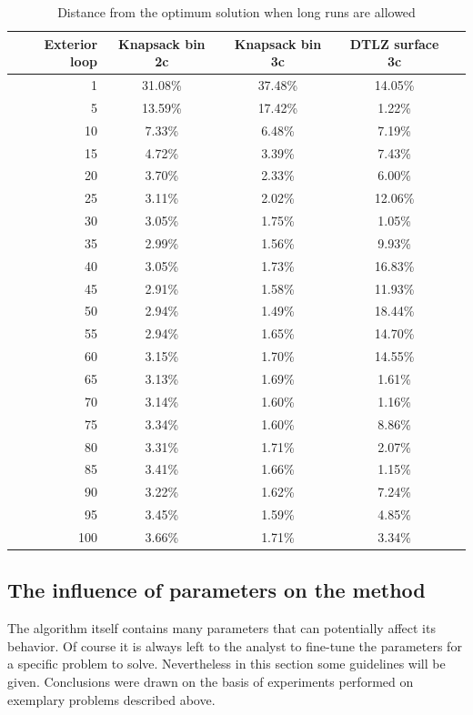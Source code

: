 \begin{table}
  \centering
  \begin{tabular}{r c c c c}
    \hline
    Exterior loop & Knapsack bin 2c & Knapsack bin 3c &
    DTLZ surface 3c \\
    \hline
    \hline
    1 & 31.08\% & 37.48\% & 14.05\% \\
    5 & 13.59\% & 17.42\% & 1.22\% \\
    10 & 7.33\% & 6.48\% & 7.19\% \\
    15 & 4.72\% & 3.39\% & 7.43\% \\
    20 & 3.70\% & 2.33\% & 6.00\% \\
    25 & 3.11\% & 2.02\% & 12.06\% \\
    30 & 3.05\% & 1.75\% & 1.05\% \\
    35 & 2.99\% & 1.56\% & 9.93\% \\
    40 & 3.05\% & 1.73\% & 16.83\% \\
    45 & 2.91\% & 1.58\% & 11.93\% \\
    50 & 2.94\% & 1.49\% & 18.44\% \\
    55 & 2.94\% & 1.65\% & 14.70\% \\
    60 & 3.15\% & 1.70\% & 14.55\% \\
    65 & 3.13\% & 1.69\% & 1.61\% \\
    70 & 3.14\% & 1.60\% & 1.16\% \\
    75 & 3.34\% & 1.60\% & 8.86\% \\
    80 & 3.31\% & 1.71\% & 2.07\% \\
    85 & 3.41\% & 1.66\% & 1.15\% \\
    90 & 3.22\% & 1.62\% & 7.24\% \\
    95 & 3.45\% & 1.59\% & 4.85\% \\
    100 & 3.66\% & 1.71\% & 3.34\% \\
    \hline
  \end{tabular}
  \caption{Distance from the optimum solution when long runs are allowed}
  \label{t:opt_dist_long}
\end{table}

\clearpage{}
\subsection{The influence of parameters on the method}

The algorithm itself contains many parameters that can potentially affect its
behavior. Of course it is always left to the analyst to fine-tune the
parameters for a specific problem to solve. Nevertheless in this section some
guidelines will be given. Conclusions were drawn on the basis of experiments
performed on exemplary problems described above.

